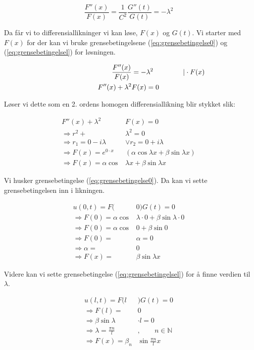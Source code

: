 \begin{equation*}
	\frac{F''(x)}{F(x)} = \frac{1}{C^2} \frac{G''(t)}{G(t)} = - \lambda^2
\end{equation*}

Da får vi to differensiallikninger vi kan løse, $F(x)$ og $G(t)$. Vi starter med $F(x)$ for der
kan vi bruke grensebetingelsene (\ref{eq:grensebetingelse0}) og (\ref{eq:grensebetingelsel}) for 
løsningen.

\begin{align*}
	\hspace{20ex} \frac{F''(x)}{F(x)} &= - \lambda^2 \hspace{10ex} \vert \cdot F(x)\\
	F''(x) + \lambda^2&F(x) = 0
\end{align*}

Løser vi dette som en 2. ordens homogen differensiallikning blir stykket slik:

\begin{align*}
	F''(x) + \lambda^2&F(x) = 0 \\ 
	\Rightarrow r^2 + &\lambda^2 = 0 \\
	\Rightarrow r_1 = 0 - i \lambda &\vee r_2 = 0 + i \lambda \\
	\Rightarrow F(x) = e^{0 \cdot x} & \left( \alpha  \cos \lambda x + \beta \sin \lambda x \right) \\
	\Rightarrow F(x) = \alpha \cos& \lambda x + \beta \sin \lambda x 
\end{align*}

Vi husker grensebetingelse (\ref{eq:grensebetingelse0}). Da kan vi sette grensebetingelsen inn 
i likningen.

\begin{align*}
	u(0 , t) = F(&0)G(t) = 0\\
	\Rightarrow F(0) = \alpha \cos&\lambda \cdot 0 + \beta \sin \lambda \cdot 0 \\
	\Rightarrow F(0) = \alpha \cos&0 + \beta \sin 0 \\
	\Rightarrow F(0) = &\alpha = 0 \\
	\Rightarrow \alpha =& 0 \\
	\Rightarrow F(x) = &\beta \sin \lambda x
\end{align*}

Videre kan vi sette grensebetingelse (\ref{eq:grensebetingelsel}) for å finne verdien til $\lambda$.

\begin{align*}
	u(l ,t) = F(l&)G(t) = 0 \\
	\Rightarrow F(l) =& 0 \\
	\Rightarrow \beta \sin \lambda &\cdot l = 0 \\ 
	\Rightarrow \lambda = \frac{\pi n}{l}&, \qquad n \in \mathbb{N} \\
	\Rightarrow F(x) = { \beta }_n & \sin \frac{\pi n}{l} x
\end{align*}

